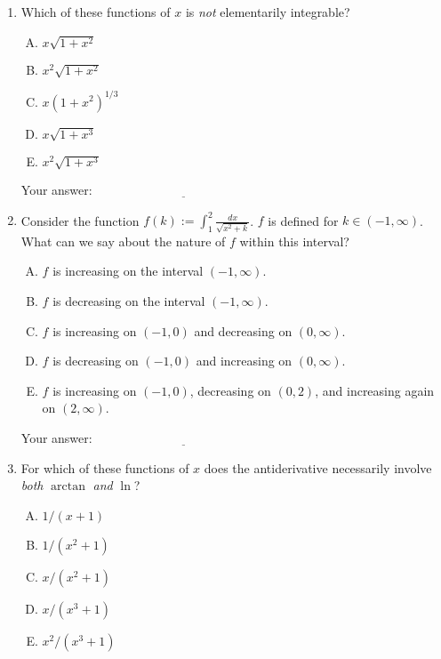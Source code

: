 \documentclass[10pt]{amsart}
\begin{document}
\begin{enumerate}
\item Which of these functions of $x$ is {\em not} elementarily
  integrable?

  \begin{enumerate}[(A)]
  \item $x\sqrt{1 + x^2}$
  \item $x^2\sqrt{1 + x^2}$
  \item $x(1 + x^2)^{1/3}$
  \item $x\sqrt{1 + x^3}$
  \item $x^2\sqrt{1 + x^3}$
  \end{enumerate}

  \vspace{0.05in}
  Your answer: $\underline{\qquad\qquad\qquad\qquad\qquad\qquad\qquad}$
  \vspace{0.05in}

\item Consider the function $f(k) := \int_1^2 \frac{dx}{\sqrt{x^2 +
  k}}$. $f$ is defined for $k \in (-1,\infty)$. What can we say about
  the nature of $f$ within this interval?

  \begin{enumerate}[(A)]
  \item $f$ is increasing on the interval $(-1,\infty)$.
  \item $f$ is decreasing on the interval $(-1,\infty)$.
  \item $f$ is increasing on $(-1,0)$ and decreasing on $(0,\infty)$.
  \item $f$ is decreasing on $(-1,0)$ and increasing on $(0,\infty)$.
  \item $f$ is increasing on $(-1,0)$, decreasing on $(0,2)$, and
    increasing again on $(2,\infty)$.
  \end{enumerate}

  \vspace{0.05in}
  Your answer: $\underline{\qquad\qquad\qquad\qquad\qquad\qquad\qquad}$
  \vspace{0.05in}

\item For which of these functions of $x$ does the antiderivative
  necessarily involve {\em both} $\arctan$ {\em and} $\ln$?

  \begin{enumerate}[(A)]
  \item $1/(x + 1)$
  \item $1/(x^2 + 1)$
  \item $x/(x^2 + 1)$
  \item $x/(x^3 + 1)$
  \item $x^2/(x^3 + 1)$
  \end{enumerate}


\end{enumerate}
\end{document}
